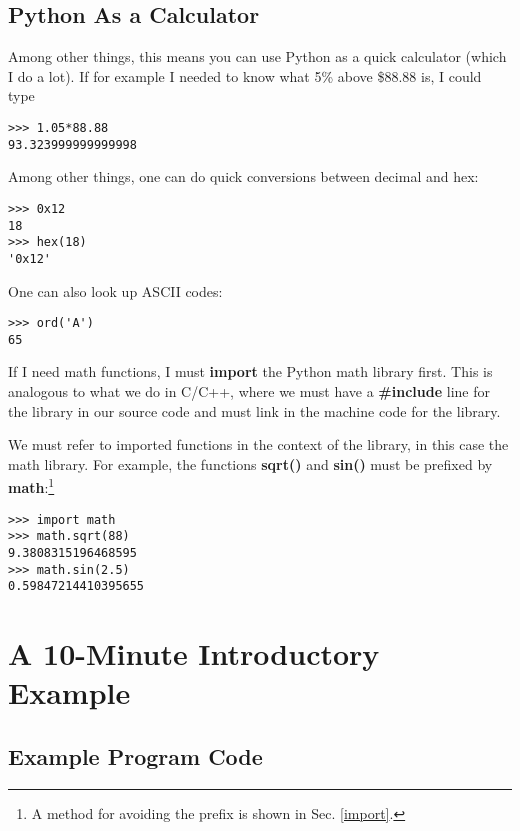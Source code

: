 \subsection{Python As a Calculator} 

Among other things, this means you can use Python as a quick calculator
(which I do a lot).  If for example I needed to know what 5\% above
\$88.88 is, I could type

\begin{Verbatim}[fontsize=\relsize{-2}]
% python
>>> 1.05*88.88
93.323999999999998
\end{Verbatim}

Among other things, one can do quick conversions between decimal and
hex:

\begin{Verbatim}[fontsize=\relsize{-2}]
>>> 0x12
18
>>> hex(18)
'0x12'
\end{Verbatim}

One can also look up ASCII codes:

\begin{lstlisting}
>>> ord('A')
65
\end{lstlisting}

If I need math functions, I must {\bf import} the Python math library
first.  This is analogous to what we do in C/C++, where we must have a
{\bf \#include} line for the library in our source code and must link in
the machine code for the library.  

We must refer to imported functions in the context of the library, in
this case the math library.  For example, the functions {\bf sqrt()} and
{\bf sin()} must be prefixed by {\bf math}:\footnote{A method for
avoiding the prefix is shown in Sec.  \ref{import}.}

\begin{Verbatim}[fontsize=\relsize{-2}]
>>> import math
>>> math.sqrt(88)
9.3808315196468595
>>> math.sin(2.5)
0.59847214410395655
\end{Verbatim}

\section{A 10-Minute Introductory Example}
\label{tenmin}

\subsection{Example Program Code}
\label{tme}

